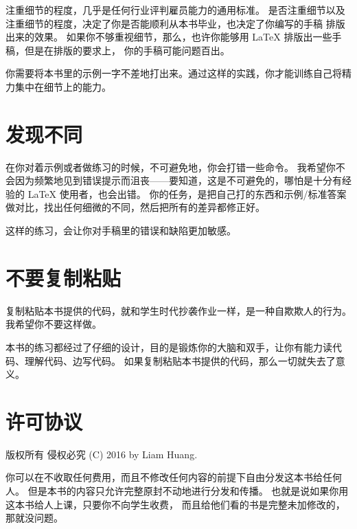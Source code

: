 注重细节的程度，几乎是任何行业评判雇员能力的通用标准。
是否注重细节以及注重细节的程度，决定了你是否能顺利从本书毕业，也决定了你编写的手稿
排版出来的效果。
如果你不够重视细节，那么，也许你能够用 \LaTeX{} 排版出一些手稿，但是在排版的要求上，
你的手稿可能问题百出。

你需要将本书里的示例一字不差地打出来。通过这样的实践，你才能训练自己将精力集中在细节上的能力。

\section*{发现不同}
\label{sec:the_difference}

在你对着示例或者做练习的时候，不可避免地，你会打错一些命令。
我希望你不会因为频繁地见到错误提示而沮丧——要知道，这是不可避免的，哪怕是十分有经验的 \LaTeX{}
使用者，也会出错。
你的任务，是把自己打的东西和示例/标准答案做对比，找出任何细微的不同，然后把所有的差异都修正好。

这样的练习，会让你对手稿里的错误和缺陷更加敏感。

\section*{不要复制粘贴}
\label{sec:no_copy_and_paste}

复制粘贴本书提供的代码，就和学生时代抄袭作业一样，是一种自欺欺人的行为。我希望你不要这样做。

本书的练习都经过了仔细的设计，目的是锻炼你的大脑和双手，让你有能力读代码、理解代码、边写代码。
如果复制粘贴本书提供的代码，那么一切就失去了意义。

\section*{许可协议}
\label{sec:license}

版权所有 侵权必究 (C) 2016 by Liam Huang.

你可以在不收取任何费用，而且不修改任何内容的前提下自由分发这本书给任何人。
但是本书的内容只允许完整原封不动地进行分发和传播。
也就是说如果你用这本书给人上课，只要你不向学生收费，
而且给他们看的书是完整未加修改的，那就没问题。
